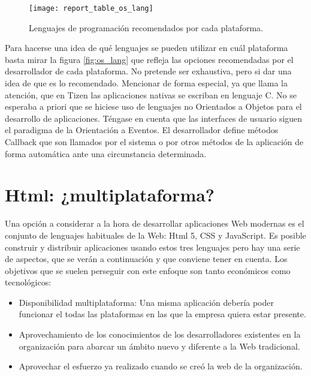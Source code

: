 \documentclass[
10pt, %
a4paper, %
oneside, %
headinclude,footinclude, %
BCOR5mm, %
]{scrartcl}
\begin{document}
\begin{figure}[h]
\centering 
\texttt{[image: report\_table\_os\_lang]} 
\caption[Lenguajes recomendados por cada plataforma]{Lenguajes de programación recomendados por cada plataforma.} 
\label{fig:os_lang} 
\end{figure}

Para hacerse una idea de qué lenguajes se pueden utilizar en cuál plataforma basta mirar la figura \vref{fig:os_lang} que refleja las opciones recomendadas por el desarrollador de cada plataforma. No pretende ser exhaustiva, pero si dar una idea de que es lo recomendado. Mencionar de forma especial, ya que llama la atención, que en Tizen las aplicaciones nativas se escriban en lenguaje C. No se esperaba a priori que se hiciese uso de lenguajes no Orientados a Objetos para el desarrollo de aplicaciones. Téngase en cuenta que las interfaces de usuario siguen el paradigma de la Orientación a Eventos. El desarrollador define métodos Callback que son llamados por el sistema o por otros métodos de la aplicación de forma automática ante una circunstancia determinada.

\section{Html: ¿multiplataforma?}
Una opción a considerar a la hora de desarrollar aplicaciones Web modernas es el conjunto de lenguajes habituales de la Web: Html 5, CSS y JavaScript. Es posible construir y distribuir aplicaciones usando estos tres lenguajes pero hay una serie de aspectos, que se verán a continuación y que conviene tener en cuenta. Los objetivos que se suelen perseguir con este enfoque son tanto económicos como tecnológicos: 

\begin{itemize}
\item Disponibilidad multiplataforma: Una misma aplicación debería poder funcionar el todas las plataformas en las que la empresa quiera estar presente.
\item Aprovechamiento de los conocimientos de los desarrolladores existentes en la organización para abarcar un ámbito nuevo y diferente a la Web tradicional.
\item Aprovechar el esfuerzo ya realizado cuando se creó la web de la organización.
\end{itemize}
\end{document}
